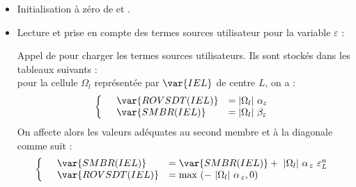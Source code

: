 \begin{itemize}
\item Initialisation \`a z\'ero de  et .

\item{Lecture et prise en compte des termes sources utilisateur pour la variable $\varepsilon$ :}

Appel de  pour charger les termes sources utilisateurs. Ils sont
stock\'es dans les tableaux suivants :\\
pour la cellule $\Omega_l$ repr\'esent\'ee par $\var{IEL}$ de centre $L$, on a :
\begin{equation}\notag
\left\{\begin{array}{lll}
&\var{ROVSDT(IEL)}&= |\Omega_l| \ \alpha_{\varepsilon}\\
&\var{SMBR(IEL)}&=|\Omega_l| \ \beta_{\varepsilon}\\
\end{array}\right.
\end{equation}
On affecte alors les valeurs ad\'equates au second membre  et \`a la
diagonale  comme suit :
\begin{equation}\notag
\left\{\begin{array}{lll}
&\var{SMBR(IEL)} &= \var{SMBR(IEL)} +\ |\Omega_l| \ \alpha_{\,\varepsilon} \
\varepsilon^n_L \\
&\var{ROVSDT(IEL)}&= \text{max }(-\ |\Omega_l| \ \alpha_{\,\varepsilon},0)\\
\end{array}\right.
\end{equation}


\end{itemize}
